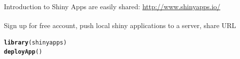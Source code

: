 \documentclass[serif]{beamer}\usepackage[]{graphicx}\usepackage[]{color}
\makeatletter
\newcommand{\hlstd}[1]{\textcolor[rgb]{0.345,0.345,0.345}{#1}}%
\newcommand{\hlkwd}[1]{\textcolor[rgb]{0.737,0.353,0.396}{\textbf{#1}}}%
\newenvironment{kframe}{%
 \def\at@end@of@kframe{}%
 \ifinner\ifhmode%
  \def\at@end@of@kframe{\end{minipage}}%
  \begin{minipage}{\columnwidth}%
 \fi\fi%
 \def\FrameCommand##1{\hskip\@totalleftmargin \hskip-\fboxsep
 \colorbox{shadecolor}{##1}\hskip-\fboxsep
     \hskip-\linewidth \hskip-\@totalleftmargin \hskip\columnwidth}%
 \MakeFramed {\advance\hsize-\width
   \@totalleftmargin\z@ \linewidth\hsize
   \@setminipage}}%
 {\par\unskip\endMakeFramed%
 \at@end@of@kframe}
\makeatother
\begin{document}
\begin{frame}[t, fragile]{Introduction to Shiny}
Apps are easily shared: \href{http://www.shinyapps.io/}{http://www.shinyapps.io/} \\~\\
Sign up for free account, push local shiny applications to a server, share URL
\begin{kframe}
\begin{alltt}
\hlkwd{library}\hlstd{(shinyapps)}
\hlkwd{deployApp}\hlstd{()}
\end{alltt}
\end{kframe}

\end{frame}

\end{document}
